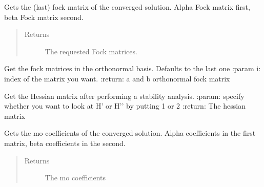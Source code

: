 \documentclass[letterpaper,10pt,english]{sphinxmanual}
\begin{document}
\begin{fulllineitems}

\begin{fulllineitems}
\label{\detokenize{UHF:hf.HartreeFock.UHF.MF.get_fock}}
Gets the (last) fock matrix of the converged solution.
Alpha Fock matrix first, beta Fock matrix second.
\begin{quote}\begin{description}
\item[{Returns}] \leavevmode
The requested Fock matrices.

\end{description}\end{quote}

\end{fulllineitems}


\begin{fulllineitems}
\label{\detokenize{UHF:hf.HartreeFock.UHF.MF.get_fock_orth}}
Get the fock matrices in the orthonormal basis. Defaults to the last one
:param i: index of the matrix you want.
:return: a and b orthonormal fock matrix

\end{fulllineitems}


\begin{fulllineitems}
\label{\detokenize{UHF:hf.HartreeFock.UHF.MF.get_hessian}}
Get the Hessian matrix after performing a stability analysis.
:param: specify whether you want to look at H’ or H’’ by putting 1 or 2
:return: The hessian matrix

\end{fulllineitems}


\begin{fulllineitems}
\label{\detokenize{UHF:hf.HartreeFock.UHF.MF.get_mo_coeff}}
Gets the mo coefficients of the converged solution.
Alpha coefficients in the first matrix, beta coefficients in the second.
\begin{quote}\begin{description}
\item[{Returns}] \leavevmode
The mo coefficients


\end{description}
\end{quote}
\end{fulllineitems}
\end{fulllineitems}
\end{document}
